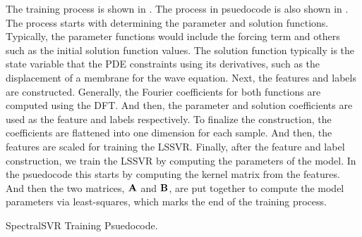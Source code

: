 \documentclass[preprint,12pt,times,authoryear]{elsarticle}
\begin{document}
The training process is shown in . The process in psuedocode is also shown in . The process starts with determining the parameter and solution functions. Typically, the parameter functions would include the forcing term and others such as the initial solution function values. The solution function typically is the state variable that the PDE constraints using its derivatives, such as the displacement of a membrane for the wave equation. Next, the features and labels are constructed. Generally, the Fourier coefficients for both functions are computed using the DFT\@. And then, the parameter and solution coefficients are used as the feature and labels respectively. To finalize the construction, the coefficients are flattened into one dimension for each sample. And then, the features are scaled for training the LSSVR\@. Finally, after the feature and label construction, we train the LSSVR by computing the parameters of the model. In the psuedocode this starts by computing the kernel matrix from the features. And then the two matrices, \(\vb{A}\) and \(\vb{B}\), are put together to compute the model parameters via least-squares, which marks the end of the training process.
\begin{algorithm}[hbp]
  \caption{SpectralSVR Training Psuedocode.}\label{alg:spectralsvr_training_psuedocode}
  \begin{algorithmic}[1]
    \EndProcedure{}
  \end{algorithmic}
\end{algorithm}

\end{document}

